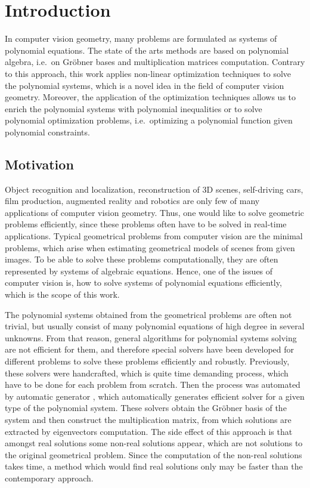 \chapter{Introduction}
In computer vision geometry, many problems are formulated as systems of polynomial equations.
The state of the arts methods are based on polynomial algebra, i.e.\ on Gr\"obner bases and multiplication matrices computation.
Contrary to this approach, this work applies non-linear optimization techniques to solve the polynomial systems, which is a novel idea in the field of computer vision geometry.
Moreover, the application of the optimization techniques allows us to enrich the polynomial systems with polynomial inequalities or to solve polynomial optimization problems, i.e.\ optimizing a polynomial function given polynomial constraints.

\section{Motivation}
Object recognition and localization, reconstruction of 3D scenes, self-driving cars, film production, augmented reality and robotics are only few of many applications of computer vision geometry.
Thus, one would like to solve geometric problems efficiently, since these problems often have to be solved in real-time applications.
Typical geometrical problems from computer vision are the minimal problems, which arise when estimating geometrical models of scenes from given images.
To be able to solve these problems computationally, they are often represented by systems of algebraic equations.
Hence, one of the issues of computer vision is, how to solve systems of polynomial equations efficiently, which is the scope of this work.

The polynomial systems obtained from the geometrical problems are often not trivial, but usually consist of many polynomial equations of high degree in several unknowns.
From that reason, general algorithms for polynomial systems solving are not efficient for them, and therefore special solvers have been developed for different problems to solve these problems efficiently and robustly.
Previously, these solvers were handcrafted, which is quite time demanding process, which have to be done for each problem from scratch.
Then the process was automated by automatic generator \cite{autogen}, which automatically generates efficient solver for a given type of the polynomial system.
These solvers obtain the Gr\"obner basis of the system and then construct the multiplication matrix, from which solutions are extracted by eigenvectors computation.
The side effect of this approach is that amongst real solutions some non-real solutions appear, which are not solutions to the original geometrical problem.
Since the computation of the non-real solutions takes time, a method which would find real solutions only may be faster than the contemporary approach.

